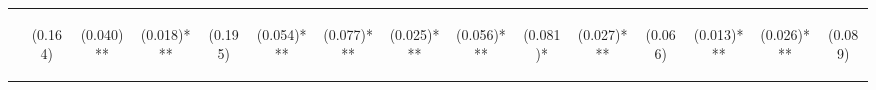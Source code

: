 \begin{center}
\begin{tabular}{lcccccccccccccc}
 & \begin{normalsize}(0.164)\end{normalsize} & \begin{normalsize}(0.040)**\end{normalsize} & \begin{normalsize}(0.018)***\end{normalsize} & \begin{normalsize}(0.195)\end{normalsize} & \begin{normalsize}(0.054)***\end{normalsize} & \begin{normalsize}(0.077)***\end{normalsize} & \begin{normalsize}(0.025)***\end{normalsize} & \begin{normalsize}(0.056)***\end{normalsize} & \begin{normalsize}(0.081)*\end{normalsize} & \begin{normalsize}(0.027)***\end{normalsize} & \begin{normalsize}(0.066)\end{normalsize} & \begin{normalsize}(0.013)***\end{normalsize} & \begin{normalsize}(0.026)***\end{normalsize} & \begin{normalsize}(0.089)\end{normalsize}\\

\end{tabular}
\end{center}
